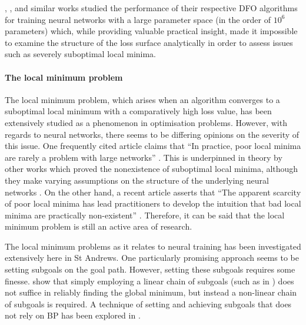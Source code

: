 \citeauthor{aly2019}, \citeauthor{such2017}, and similar works studied the performance of their respective DFO algorithms for training neural networks with a large parameter space (in the order of $10^6$ parameters) which, while providing valuable practical insight, made it impossible to examine the structure of the loss surface analytically in order to assess issues such as severely suboptimal local minima.

\paragraph{The local minimum problem}
The local minimum problem, which arises when an algorithm converges to a suboptimal local minimum with a comparatively high loss value, has been extensively studied as a phenomenon in optimisation problems.
However, with regards to neural networks, there seems to be differing opinions on the severity of this issue. 
One frequently cited article claims that ``In practice, poor local minima are rarely a problem with large networks'' \cite{lecun2015}.
This is underpinned in theory by other works which proved the nonexistence of suboptimal local minima, although they make varying assumptions on the structure of the underlying neural networks \cite{kawaguchi2016,nguyen2018,laurent2018}.
On the other hand, a recent article asserts that ``The apparent scarcity of poor local minima has lead practitioners to develop the intuition that bad local minima \elide are practically non-existent'' \cite{goldblum2019}.
Therefore, it can be said that the local minimum problem is still an active area of research.

The local minimum problems as it relates to neural training has been investigated extensively here in St Andrews. 
One particularly promising approach seems to be setting subgoals on the goal path.
However, setting these subgoals requires some finesse.
\textcite{lewis1999} show that simply employing a linear chain of subgoals (such as in \textcite{gorse1997}) does not suffice in reliably finding the global minimum, but instead a non-linear chain of subgoals is required.
A technique of setting and achieving subgoals that does not rely on BP has been explored in \textcite{weir2000}.

